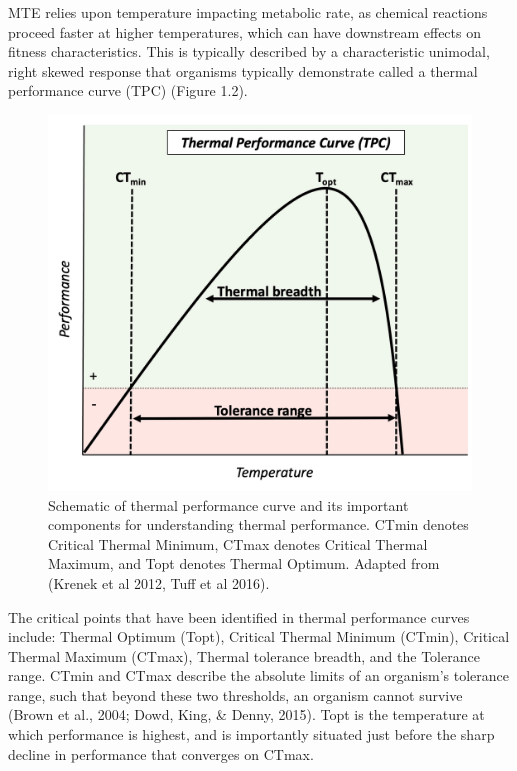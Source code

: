 \documentclass[12pt,twoside]{reedthesis}
\begin{document}
MTE relies upon temperature impacting metabolic rate, as chemical reactions proceed faster at higher temperatures, which can have downstream effects on fitness characteristics. This is typically described by a characteristic unimodal, right skewed response that organisms typically demonstrate called a thermal performance curve (TPC) (Figure 1.2).
\begin{figure}

{\centering \includegraphics[width=0.9\linewidth]{figures/figure2} 

}

\caption[Thermal performance curve components]{Schematic of thermal performance curve and its important components for understanding thermal performance. CTmin denotes Critical Thermal Minimum, CTmax denotes Critical Thermal Maximum, and Topt denotes Thermal Optimum. Adapted from (Krenek et al 2012, Tuff et al 2016).}\label{fig:unnamed-chunk-4}
\end{figure}
The critical points that have been identified in thermal performance curves include: Thermal Optimum (Topt), Critical Thermal Minimum (CTmin), Critical Thermal Maximum (CTmax), Thermal tolerance breadth, and the Tolerance range. CTmin and CTmax describe the absolute limits of an organism's tolerance range, such that beyond these two thresholds, an organism cannot survive (Brown et al., 2004; Dowd, King, \& Denny, 2015). Topt is the temperature at which performance is highest, and is importantly situated just before the sharp decline in performance that converges on CTmax.
\end{document}
